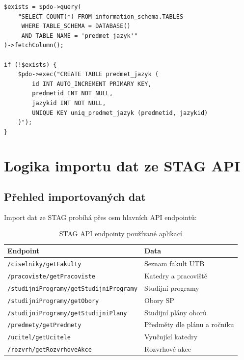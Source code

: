 \documentclass[12pt,a4paper]{report}
\begin{document}
\begin{lstlisting}[caption={Ukázka migrace s kontrolou existence tabulky}]
$exists = $pdo->query(
    "SELECT COUNT(*) FROM information_schema.TABLES
     WHERE TABLE_SCHEMA = DATABASE()
     AND TABLE_NAME = 'predmet_jazyk'"
)->fetchColumn();

if (!$exists) {
    $pdo->exec("CREATE TABLE predmet_jazyk (
        id INT AUTO_INCREMENT PRIMARY KEY,
        predmetid INT NOT NULL,
        jazykid INT NOT NULL,
        UNIQUE KEY uniq_predmet_jazyk (predmetid, jazykid)
    )");
}
\end{lstlisting}

\chapter{Logika importu dat ze STAG API}
\label{chap:import}

\section{Přehled importovaných dat}

Import dat ze STAG probíhá přes osm hlavních API endpointů:

\begin{table}[H]
\centering
\begin{tabular}{lp{7cm}}
\toprule
\textbf{Endpoint} & \textbf{Data} \\
\midrule
\texttt{/ciselniky/getFakulty} & Seznam fakult UTB \\
\texttt{/pracoviste/getPracoviste} & Katedry a pracoviště \\
\texttt{/studijniProgramy/getStudijniProgramy} & Studijní programy \\
\texttt{/studijniProgramy/getObory} & Obory SP \\
\texttt{/studijniProgramy/getStudijniPlany} & Studijní plány oborů \\
\texttt{/predmety/getPredmety} & Předměty dle plánu a ročníku \\
\texttt{/ucitel/getUcitele} & Vyučující katedry \\
\texttt{/rozvrh/getRozvrhoveAkce} & Rozvrhové akce \\
\bottomrule
\end{tabular}
\caption{STAG API endpointy používané aplikací}
\end{table}
\end{document}

